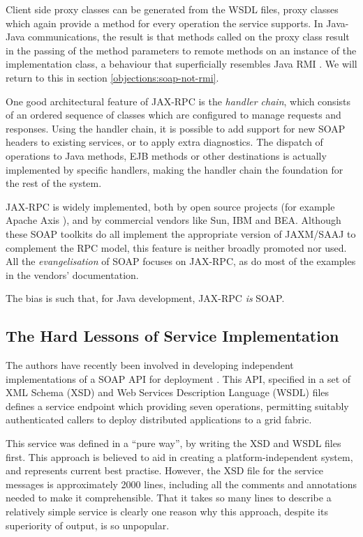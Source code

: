 Client side proxy classes can be generated from the WSDL files, proxy
classes which again provide a method for every operation the service
supports. In Java-Java communications, the result is that methods
called on the proxy class result in the passing of the method
parameters to remote methods on an instance of the implementation
class, a behaviour that superficially resembles Java RMI
\cite{paper:RMI}. We will return to this in section
\ref{objections:soap-not-rmi}.

One good architectural feature of JAX-RPC is the \emph{handler chain},
which consists of an ordered sequence of classes which are configured
to manage requests and responses. Using the handler chain, it is
possible to add support for new SOAP headers to existing services, or
to apply extra diagnostics. The dispatch of operations to Java
methods, EJB methods or other destinations is actually implemented by
specific handlers, making the handler chain the foundation for the
rest of the system.

JAX-RPC is widely implemented, both by open source projects (for
example Apache Axis \cite{apache:axis}), and by commercial vendors
like Sun, IBM and BEA. Although these SOAP toolkits do all implement
the appropriate version of JAXM/SAAJ to complement the RPC model, this
feature is neither broadly promoted nor used. All the
\emph{evangelisation} of SOAP focuses on JAX-RPC, as do most of the
examples in the vendors' documentation.

The bias is such that, for Java development, JAX-RPC \emph{is} SOAP. 

\subsection{The Hard Lessons of Service Implementation}
\label{intro:experience}

The authors have recently been involved in developing independent
implementations of a SOAP API for deployment \cite{draft:CDDLM}. This
API, specified in a set of XML Schema (XSD) \cite{spec:XSD} and Web
Services Description Language (WSDL) files \cite{spec:WSDL-11} defines
a service endpoint which providing seven operations, permitting
suitably authenticated callers to deploy distributed applications to a
grid fabric.

This service was defined in a ``pure way'', by writing the XSD and
WSDL files first. This approach is believed to aid in creating a
platform-independent system, and represents current best
practise. However, the XSD file for the service messages is
approximately 2000 lines, including all the comments and annotations
needed to make it comprehensible. That it takes so many lines to
describe a relatively simple service is clearly one reason why this
approach, despite its superiority of output, is so unpopular.

